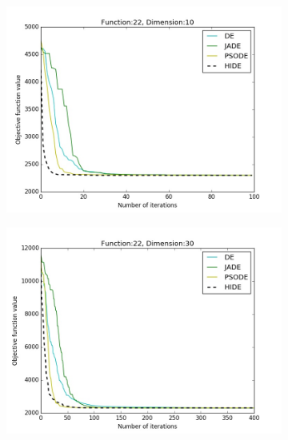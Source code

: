 \documentclass[a4paper,twoside]{article}
\begin{document}
\begin{figure}[t!]
    \begin{subfigure}[b]{0.24\textwidth}
        \includegraphics[width=\textwidth,natwidth=800,natheight=600]{plot_10D_F22_save}
        \caption{}
    \end{subfigure}
    \begin{subfigure}[b]{0.24\textwidth}
        \includegraphics[width=\textwidth,natwidth=800,natheight=600]{plot_30D_F22_save}
        \caption{}
    \end{subfigure}    
    \begin{subfigure}[b]{0.24\textwidth}

\end{subfigure}
\end{figure}
\end{document}
